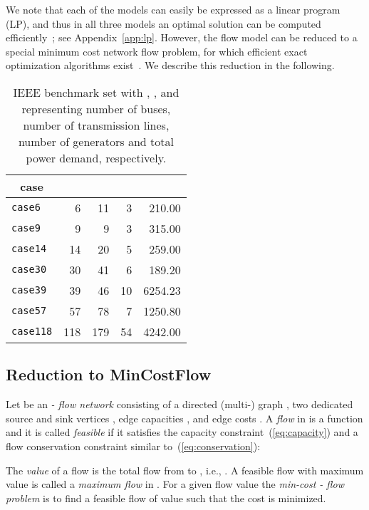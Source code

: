 \documentclass{article}[11pt,a4paper]
\begin{document}
We note that each of the models can easily be expressed as a linear
program (LP), and thus in all three models an optimal solution can be
computed efficiently~\cite{Bazaraa:2004:LPN:1062374}; see Appendix~\ref{app:lp}. 
However, the flow model can be reduced to a special minimum cost network flow 
problem, for which efficient exact optimization algorithms exist~\cite{Goldberg19971}.  We 
describe this reduction in the following.
\begin{table}[tb!]
\centering
\begin{tabular}{lrrrr}
  \toprule
  \multicolumn{1}{c}{case} & \multicolumn{1}{c}{} & \multicolumn{1}{c}{} & \multicolumn{1}{c}{} & \multicolumn{1}{c}{} \\ 
  \midrule
  \texttt{case6} &   6 &  11 &   3 & 210.00 \\ 
  \texttt{case9} &   9 &   9 &   3 & 315.00 \\ 
  \texttt{case14} &  14 &  20 &   5 & 259.00 \\ 
  \texttt{case30} &  30 &  41 &   6 & 189.20 \\ 
  \texttt{case39} &  39 &  46 &  10 & 6254.23 \\ 
  \texttt{case57} &  57 &  78 &   7 & 1250.80 \\ 
  \texttt{case118} & 118 & 179 &  54 & 4242.00 \\ 
   \bottomrule
\end{tabular}
\caption{IEEE benchmark set with , ,  and  representing number of buses, number of transmission lines, number of generators and total power demand, respectively.} 
\label{tab:examples}
\end{table}
\subsection{Reduction to MinCostFlow}
\label{sec:model-mincost-flow}
Let   be an \emph{- flow network}
consisting of a directed \mbox{(multi-)} graph , two dedicated source and sink vertices , edge capacities , and edge costs . 
A \emph{flow}  in  is a function  and it is called \emph{feasible} if it satisfies the capacity constraint~(\ref{eq:capacity}) and a flow conservation constraint similar to~(\ref{eq:conservation}):

The \emph{value}  of a flow  is the total flow from  to , i.e., . A feasible flow  with maximum value is called a \emph{maximum flow} in .
For a given flow value  the \emph{min-cost - flow problem} is to find a feasible flow  of value  such that the cost  is minimized.
\end{document}
